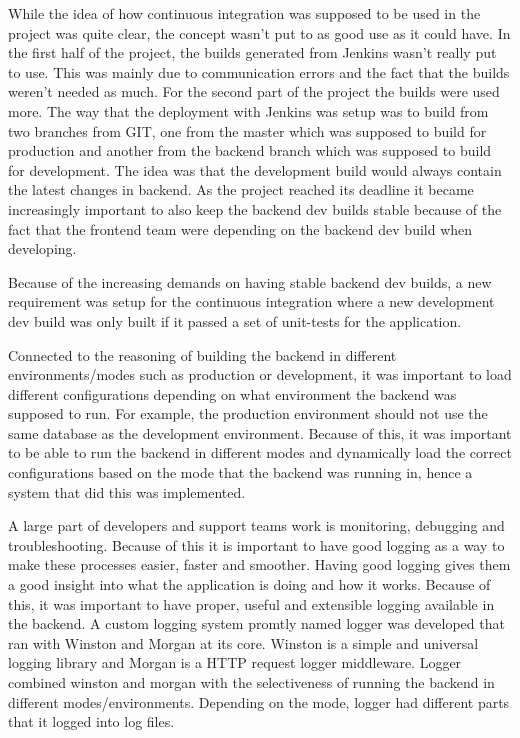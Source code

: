 While the idea of how continuous integration was supposed to be used in the project was quite clear, the concept wasn't put to as good use as it could have. In the first half of the project, the builds generated from Jenkins wasn't really put to use. This was mainly due to communication errors and the fact that the builds weren't needed as much. For the second part of the project the builds were used more. The way that the deployment with Jenkins was setup was to build from two branches from GIT, one from the master which was supposed to build for production and another from the backend branch which was supposed to build for development. The idea was that the development build would always contain the latest changes in backend. As the project reached its deadline it became increasingly important to also keep the backend dev builds stable because of the fact that the frontend team were depending on the backend dev build when developing.

Because of the increasing demands on having stable backend dev builds, a new requirement was setup for the continuous integration where a new development dev build was only built if it passed a set of unit-tests for the application.

Connected to the reasoning of building the backend in different environments/modes such as production or development, it was important to load different configurations depending on what environment the backend was supposed to run. For example, the production environment should not use the same database as the development environment. Because of this, it was important to be able to run the backend in different modes and dynamically load the correct configurations based on the mode that the backend was running in, hence a system that did this was implemented.

A large part of developers and support teams work is monitoring, debugging and troubleshooting. Because of this it is important to have good logging as a way to make these processes easier, faster and smoother. Having good logging gives them a good insight into what the application is doing and how it works. Because of this, it was important to have proper, useful and extensible logging available in the backend. A custom logging system promtly named logger was developed that ran with Winston and Morgan at its core. Winston is a simple and universal logging library and Morgan is a HTTP request logger middleware. Logger combined winston and morgan with the selectiveness of running the backend in different modes/environments. Depending on the mode, logger had different parts that it logged into log files.

